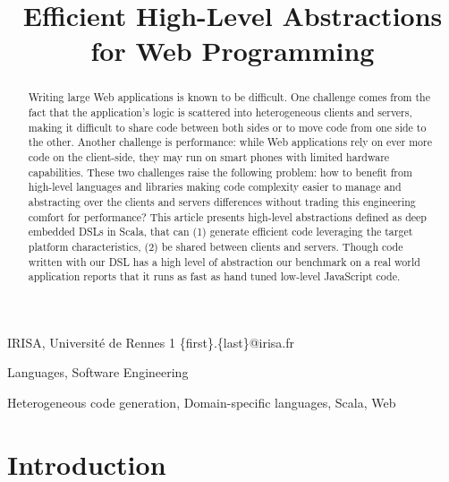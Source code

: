 \documentclass[preprint]{sigplanconf}
\begin{document}
\copyrightdata{[to be supplied]} 


\title{Efficient High-Level Abstractions for Web Programming}

           {IRISA, Université de Rennes 1}
           {\{first\}.\{last\}@irisa.fr}

\maketitle

\begin{abstract}
Writing large Web applications is known to be difficult. One challenge comes from the fact that the
application's logic is scattered into heterogeneous clients and servers, making it difficult to
share code between both sides or to move code from one side to the other. Another challenge is
performance: while Web applications rely on ever more code on the client-side, they may run on smart
phones with limited hardware capabilities. These two challenges raise the following problem: how to
benefit from high-level languages and libraries making code complexity easier to manage and
abstracting over the clients and servers differences without trading this engineering comfort for
performance? This article presents high-level abstractions defined as deep embedded DSLs in Scala,
that can (1) generate efficient code leveraging the target platform characteristics, (2) be shared
between clients and servers. Though code written with our DSL has a high level of abstraction our
benchmark on a real world application reports that it runs as fast as hand tuned low-level
JavaScript code.
\end{abstract}


\terms Languages, Software Engineering

\keywords Heterogeneous code generation, Domain-specific languages, Scala, Web

\section{Introduction}
\end{document}
